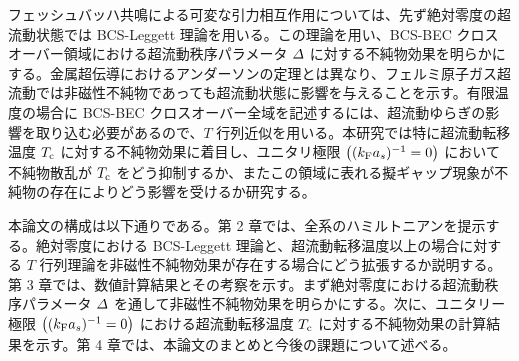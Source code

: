 フェッシュバッハ共鳴による可変な引力相互作用については、先ず絶対零度の超流動状態では BCS-Leggett 理論を用いる。この理論を用い、BCS-BEC クロスオーバー領域における超流動秩序パラメータ $\varDelta$ に対する不純物効果を明らかにする。金属超伝導におけるアンダーソンの定理とは異なり、フェルミ原子ガス超流動では非磁性不純物であっても超流動状態に影響を与えることを示す。有限温度の場合に BCS-BEC クロスオーバー全域を記述するには、超流動ゆらぎの影響を取り込む必要があるので、$T$ 行列近似を用いる。本研究では特に超流動転移温度 $T_{\text{c}}$ に対する不純物効果に着目し、ユニタリ極限 $\left((k_{\text{F}} a_s)^{-1}=0\right)$ において不純物散乱が $T_{\text{c}}$ をどう抑制するか、またこの領域に表れる擬ギャップ現象が不純物の存在によりどう影響を受けるか研究する。

本論文の構成は以下通りである。第 2 章では、全系のハミルトニアンを提示する。絶対零度における BCS-Leggett 理論と、超流動転移温度以上の場合に対する $T$ 行列理論を非磁性不純物効果が存在する場合にどう拡張するか説明する。第 3 章では、数値計算結果とその考察を示す。まず絶対零度における超流動秩序パラメータ $\varDelta$ を通して非磁性不純物効果を明らかにする。次に、ユニタリー極限 $\left((k_{\text{F}} a_s)^{-1}=0\right)$ における超流動転移温度 $T_{\text{c}}$ に対する不純物効果の計算結果を示す。第 4 章では、本論文のまとめと今後の課題について述べる。


